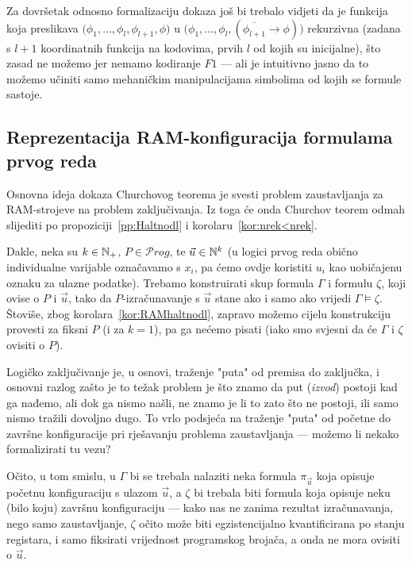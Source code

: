 Za dovršetak odnosno formalizaciju dokaza još bi trebalo vidjeti da je funkcija koja preslikava $\bigl(\phi_1,\dotsc,\phi_l,\phi_{l+1},\phi\bigr)$ u $\bigl(\phi_1,\dotsc,\phi_l,(\overline{\phi_{l+1}}\to\phi)\bigr)$ rekurzivna (zadana s $l+1$ koordinatnih funkcija na kodovima, prvih $l$ od kojih su inicijalne), što zasad ne možemo jer nemamo kodiranje $F1$ --- ali je intuitivno jasno da to možemo učiniti samo mehaničkim manipulacijama simbolima od kojih se formule sastoje.

\subsection{Reprezentacija RAM-konfiguracija formulama prvog reda}

Osnovna ideja dokaza Churchovog teorema je svesti problem zaustavljanja za RAM-strojeve na problem zaključivanja. Iz toga će onda Churchov teorem odmah slijediti po propoziciji~\ref{pp:Haltnodl} i korolaru~\ref{kor:nrek<nrek}.

Dakle, neka su $k\in{\mathbb N}_+$, $P\in\mathcal Prog$, te $\vec u\in{\mathbb N}^k$ (u logici prvog reda obično individualne varijable označavamo s $x_i$, pa ćemo ovdje koristiti $u_i$ kao uobičajenu oznaku za ulazne podatke). Trebamo konstruirati skup formula $\Gamma$ i formulu $\zeta$, koji ovise o $P$ i $\vec u$, tako da $P$-izračunavanje s $\vec u$ stane ako i samo ako vrijedi $\Gamma\models\zeta$. Štoviše, zbog korolara~\ref{kor:RAMhaltnodl}, zapravo možemo cijelu konstrukciju provesti za fiksni $P$ (i za $k=1$), pa ga nećemo pisati (iako smo svjesni da će $\Gamma$ i $\zeta$ ovisiti o $P$).

Logičko zaključivanje je, u osnovi, traženje "puta" od premisa do zaključka, i osnovni razlog zašto je to težak problem je što znamo da put (\emph{izvod}) postoji kad ga nađemo, ali dok ga nismo našli, ne znamo je li to zato što ne postoji, ili samo nismo tražili dovoljno dugo. To vrlo podsjeća na traženje "puta" od početne do završne konfiguracije pri rješavanju problema zaustavljanja --- možemo li nekako formalizirati tu vezu?

Očito, u tom smislu, u $\Gamma$ bi se trebala nalaziti neka formula $\pi_{\vec u}$ koja opisuje početnu konfiguraciju s ulazom $\vec u$, a $\zeta$ bi trebala biti formula koja opisuje neku (bilo koju) završnu konfiguraciju --- kako nas ne zanima rezultat izračunavanja, nego samo zaustavljanje, $\zeta$ očito može biti egzistencijalno kvantificirana po stanju registara, i samo fiksirati vrijednost programskog brojača, a onda ne mora ovisiti o $\vec u$.

